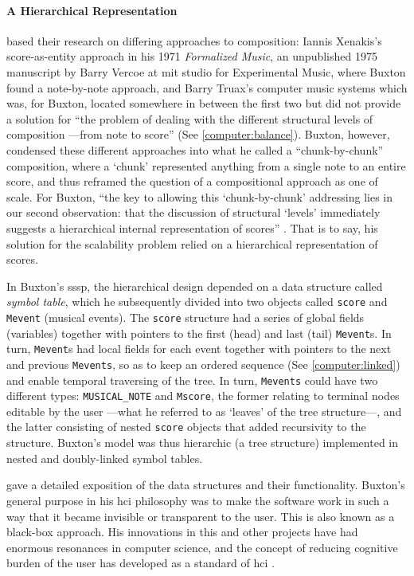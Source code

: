 \documentclass[
]{book}
\newcommand{\see}[1]{(See \ref{#1})}
\begin{document}
\paragraph{A Hierarchical Representation}
\textcite{DBLP:conf/icmc/BuxtonFBRSCM78} based their research on differing approaches to composition: Iannis Xenakis's score-as-entity approach in his 1971 \textit{Formalized Music}, an unpublished 1975 manuscript by Barry Vercoe at \gls{mit} studio for Experimental Music, where Buxton found a note-by-note approach, and Barry Truax's computer music systems \parencite{Tru73:The} which was, for Buxton, located somewhere in between the first two but did not provide a solution for ``the problem of dealing with the different structural levels of composition ---from note to score'' \parencite[120]{icmc/bbp2372.1978.012} \see{computer:balance}. Buxton, however, condensed these different approaches into what he called a ``chunk-by-chunk'' composition, where a `chunk' represented anything from a single note to an entire score, and thus reframed the question of a compositional approach as one of scale. For Buxton, ``the key to allowing this `chunk-by-chunk' addressing lies in our second observation: that the discussion of structural `levels' immediately suggests a hierarchical internal representation of scores'' \parencite[120]{icmc/bbp2372.1978.012}. That is to say, his solution for the scalability problem relied on a hierarchical representation of scores. 

In Buxton's \gls{sssp}, the hierarchical design depended on a data structure called \textit{symbol table}, which he subsequently divided into two objects called \texttt{score} and \texttt{Mevent} (musical events). The \texttt{score} structure had a series of global fields (variables) together with pointers to the first (head) and last (tail) \texttt{Mevent}s. In turn, \texttt{Mevent}s had local fields for each event together with pointers to the next and previous \texttt{Mevents}, so as to keep an ordered sequence \see{computer:linked} and enable temporal traversing of the tree. In turn, \texttt{Mevents} could have two different types: \texttt{MUSICAL\_NOTE} and \texttt{Mscore}, the former relating to terminal nodes editable by the user ---what he referred to as `leaves' of the tree structure---, and the latter consisting of nested \texttt{score} objects that added recursivity to the structure. Buxton's model was thus hierarchic (a tree structure) implemented in nested and doubly-linked symbol tables.

\textcite{icmc/bbp2372.1978.012} gave a detailed exposition of the data structures and their functionality. Buxton's general purpose in his \gls{hci} philosophy was to make the software work in such a way that it became invisible or transparent to the user. This is also known as a black-box approach. His innovations in this and other projects have had enormous resonances in computer science, and the concept of reducing cognitive burden of the user has developed as a standard of \gls{hci} \parencite{youtube/buxton16}.
\end{document}
